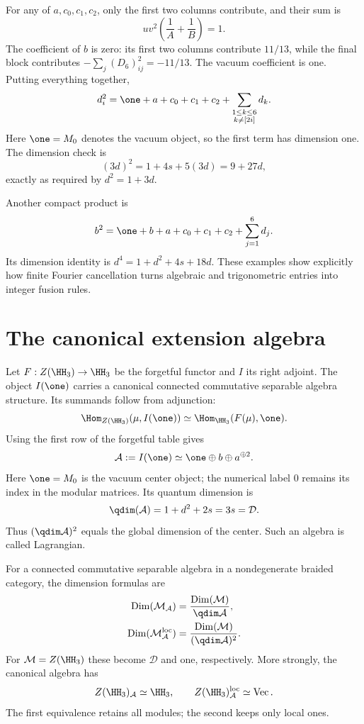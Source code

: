 For any of $a,c_0,c_1,c_2$, only the first two columns contribute,
and their sum is
\[
 uv^2\left(\frac1A+\frac1B\right)=1.
\]
The coefficient of $b$ is zero: its first two columns contribute
$11/13$, while the final block contributes
$-\sum_j(D_6)_{ij}^2=-11/13$.  The vacuum coefficient is one.
Putting everything together,
\begin{equation}
 d_i^2=\one+a+c_0+c_1+c_2+
 \sum_{\substack{1\leq k\leq6\\k\ne[2i]}}d_k.
 \label{eq:Verlinde-di-square}
\end{equation}
Here $\one=M_0$ denotes the vacuum object, so the first term has
dimension one.  The dimension check is
\[
 (3d)^2=1+4s+5(3d)=9+27d,
\]
exactly as required by $d^2=1+3d$.

Another compact product is
\[
 b^2=\one+b+a+c_0+c_1+c_2+\sum_{j=1}^6d_j.
\]
Its dimension identity is $d^4=1+d^2+4s+18d$.
These examples show explicitly how finite Fourier cancellation turns
algebraic and trigonometric entries into integer fusion rules.

\section{The canonical extension algebra}

Let $F:Z(\HH_3)\to\HH_3$ be the forgetful functor and $I$
its right adjoint.  The object $I(\one)$ carries a canonical
connected commutative separable algebra structure.  Its summands
follow from adjunction:
\[
 \Hom_{Z(\HH_3)}(\mu,I(\one))
 \simeq\Hom_{\HH_3}(F(\mu),\one).
\]
Using the first row of the forgetful table gives
\begin{equation}
 \mathcal A:=I(\one)\simeq\one\oplus b\oplus a^{\oplus2}.
 \label{eq:canonical-H3-algebra}
\end{equation}
Here $\one=M_0$ is the vacuum center object; the numerical label
$0$ remains its index in the modular matrices.  Its quantum dimension is
\begin{equation}
 \qdim(\mathcal A)=1+d^2+2s=3s=\mathcal D.
 \label{eq:canonical-H3-algebra-dimension}
\end{equation}
Thus $(\qdim\mathcal A)^2$ equals the global dimension of the
center.  Such an algebra is called Lagrangian.

For a connected commutative separable algebra in a nondegenerate
braided category, the dimension formulas are
\begin{align}
 \operatorname{Dim}(\mathcal M_{\mathcal A})
 &=\frac{\operatorname{Dim}(\mathcal M)}{\qdim\mathcal A},\notag\\
 \operatorname{Dim}(\mathcal M_{\mathcal A}^{\rm loc})
 &=\frac{\operatorname{Dim}(\mathcal M)}{(\qdim\mathcal A)^2}.
 \label{eq:algebra-module-dimensions}
\end{align}
For $\mathcal M=Z(\HH_3)$ these become $\mathcal D$ and one,
respectively.  More strongly, the canonical algebra has
\[
 Z(\HH_3)_{\mathcal A}\simeq\HH_3,
 \qquad Z(\HH_3)_{\mathcal A}^{\rm loc}\simeq\operatorname{Vec}.
\]
The first equivalence retains all modules; the second keeps only
local ones.

